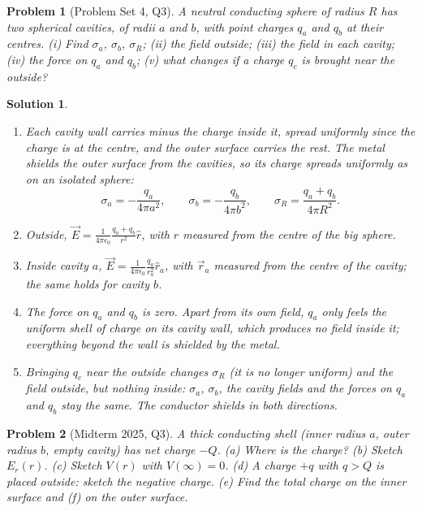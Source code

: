 \documentclass{article}
\newtheorem{problem}{Problem}
\newtheorem{solution}{Solution}
\begin{document}
\begin{problem}[Problem Set 4, Q3]
    A neutral conducting sphere of radius $R$ has two spherical cavities, of radii $a$ and $b$, with point charges $q_a$ and $q_b$ at their centres. (i) Find $\sigma_a$, $\sigma_b$, $\sigma_R$; (ii) the field outside; (iii) the field in each cavity; (iv) the force on $q_a$ and $q_b$; (v) what changes if a charge $q_c$ is brought near the outside?
\end{problem}
\begin{solution}
    \begin{enumerate}[label=(\roman*)]
        \item Each cavity wall carries minus the charge inside it, spread uniformly since the charge is at the centre, and the outer surface carries the rest. The metal shields the outer surface from the cavities, so its charge spreads uniformly as on an isolated sphere:
        \[\sigma_a = -\frac{q_a}{4\pi a^2}, \qquad \sigma_b = -\frac{q_b}{4\pi b^2}, \qquad \sigma_R = \frac{q_a + q_b}{4\pi R^2}.\]
        \item Outside, $\vec{E} = \frac{1}{4\pi\epsilon_0}\frac{q_a + q_b}{r^2}\hat{r}$, with $r$ measured from the centre of the big sphere.
        \item Inside cavity $a$, $\vec{E} = \frac{1}{4\pi\epsilon_0}\frac{q_a}{r_a^2}\hat{r}_a$, with $\vec{r}_a$ measured from the centre of the cavity; the same holds for cavity $b$.
        \item The force on $q_a$ and $q_b$ is zero. Apart from its own field, $q_a$ only feels the uniform shell of charge on its cavity wall, which produces no field inside it; everything beyond the wall is shielded by the metal.
        \item Bringing $q_c$ near the outside changes $\sigma_R$ (it is no longer uniform) and the field outside, but nothing inside: $\sigma_a$, $\sigma_b$, the cavity fields and the forces on $q_a$ and $q_b$ stay the same. The conductor shields in both directions.
    \end{enumerate}
\end{solution}
\begin{problem}[Midterm 2025, Q3]
    A thick conducting shell (inner radius $a$, outer radius $b$, empty cavity) has net charge $-Q$. (a) Where is the charge? (b) Sketch $E_r(r)$. (c) Sketch $V(r)$ with $V(\infty) = 0$. (d) A charge $+q$ with $q > Q$ is placed outside: sketch the negative charge. (e) Find the total charge on the inner surface and (f) on the outer surface.
\end{problem}
\end{document}
